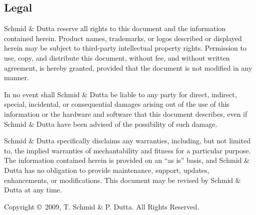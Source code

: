 \begin{multicols}{2}
\section*{\small{Legal}}

\begin{tiny}

Schmid \& Dutta reserve all rights to this document and the information
contained herein.  Product names, trademarks, or logos described or
displayed herein may be subject to third-party
intellectual property rights.  Permission to use, copy, and distribute
this document, without fee, and without written agreement, is hereby
granted, provided that the document is not modified in any manner.

\vspace{1mm}
\noindent
In no event shall Schmid \& Dutta be liable to any party for direct,
indirect, special, incidental, or consequential damages arising out of
the use of this information or the hardware and software that this
document describes, even if Schmid \& Dutta have been advised of the
possibility of such damage.

\vspace{1mm}
\noindent
Schmid \& Dutta specifically disclaims any warranties, including, but not
limited to, the implied warranties of mechantability and fitness for a
particular purpose.  The information contained herein is provided on
an ``as is'' basis, and Schmid \& Dutta has no obligation to provide
maintenance, support, updates, enhancements, or modifications.  This
document may be revised by Schmid \& Dutta at any time.

\noindent
Copyright \copyright~2009, T. Schmid \& P. Dutta.  All Rights Reserved.
\end{tiny}

\end{multicols}
